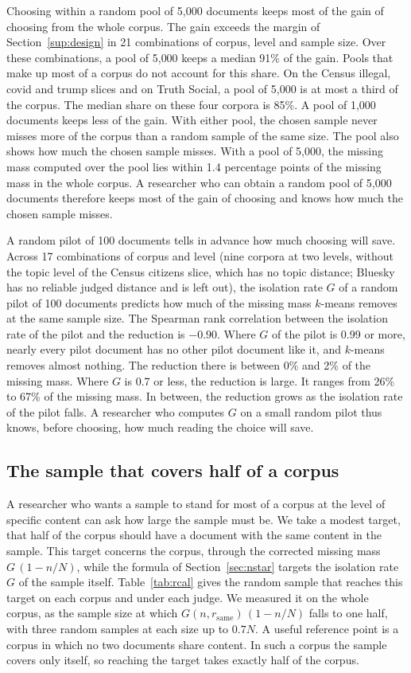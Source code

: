 Choosing within a random pool of 5{,}000 documents keeps most of the gain of choosing from the whole corpus. The gain exceeds the margin of Section~\ref{sup:design} in 21 combinations of corpus, level and sample size. Over these combinations, a pool of 5{,}000 keeps a median 91\% of the gain. Pools that make up most of a corpus do not account for this share. On the Census illegal, covid and trump slices and on Truth Social, a pool of 5{,}000 is at most a third of the corpus. The median share on these four corpora is 85\%. A pool of 1{,}000 documents keeps less of the gain. With either pool, the chosen sample never misses more of the corpus than a random sample of the same size. The pool also shows how much the chosen sample misses. With a pool of 5{,}000, the missing mass computed over the pool lies within 1.4 percentage points of the missing mass in the whole corpus. A researcher who can obtain a random pool of 5{,}000 documents therefore keeps most of the gain of choosing and knows how much the chosen sample misses.

A random pilot of 100 documents tells in advance how much choosing will save. Across 17 combinations of corpus and level (nine corpora at two levels, without the topic level of the Census citizens slice, which has no topic distance; Bluesky has no reliable judged distance and is left out), the isolation rate $G$ of a random pilot of 100 documents predicts how much of the missing mass $k$-means removes at the same sample size. The Spearman rank correlation between the isolation rate of the pilot and the reduction is $-0.90$. Where $G$ of the pilot is 0.99 or more, nearly every pilot document has no other pilot document like it, and $k$-means removes almost nothing. The reduction there is between 0\% and 2\% of the missing mass. Where $G$ is 0.7 or less, the reduction is large. It ranges from 26\% to 67\% of the missing mass. In between, the reduction grows as the isolation rate of the pilot falls. A researcher who computes $G$ on a small random pilot thus knows, before choosing, how much reading the choice will save.

\subsection{The sample that covers half of a corpus}
\label{sup:feasible}

A researcher who wants a sample to stand for most of a corpus at the level of specific content can ask how large the sample must be. We take a modest target, that half of the corpus should have a document with the same content in the sample. This target concerns the corpus, through the corrected missing mass $G\,(1 - n/N)$, while the formula of Section~\ref{sec:nstar} targets the isolation rate $G$ of the sample itself. Table~\ref{tab:rcal} gives the random sample that reaches this target on each corpus and under each judge. We measured it on the whole corpus, as the sample size at which $G(n, r_{\mathrm{same}})\,(1 - n/N)$ falls to one half, with three random samples at each size up to $0.7N$. A useful reference point is a corpus in which no two documents share content. In such a corpus the sample covers only itself, so reaching the target takes exactly half of the corpus.

